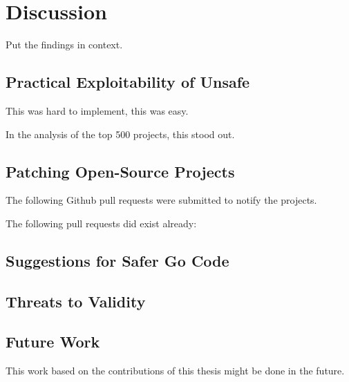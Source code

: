 
\chapter{Discussion}\label{ch:discussion}

Put the findings in context.



\section{Practical Exploitability of Unsafe}\label{sec:discussion:exploitability}

This was hard to implement, this was easy.

In the analysis of the top 500 projects, this stood out.



\section{Patching Open-Source Projects}\label{sec:discussion:patches}

The following Github pull requests were submitted to notify the projects.



The following pull requests did exist already:





\section{Suggestions for Safer Go Code}\label{sec:discussion:safer-go-code}



\section{Threats to Validity}\label{sec:discussion:threats-to-validity}



\section{Future Work}\label{sec:discussion:future-work}

This work based on the contributions of this thesis might be done in the future.

